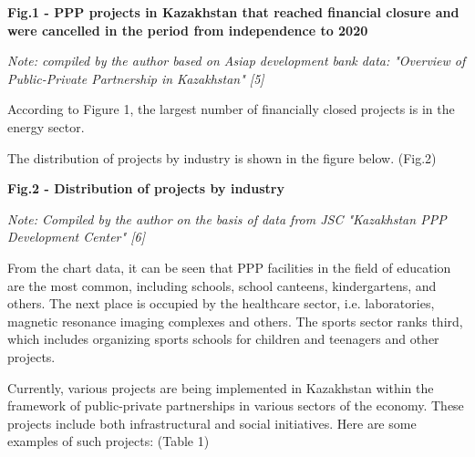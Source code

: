 {\bfseries Fig.1 - PPP projects in Kazakhstan that reached financial closure and were cancelled in the period from independence to 2020}

\emph{Note: compiled by the author based on Asiap development bank data:
"Overview of Public-Private Partnership in Kazakhstan" {[}5{]}}

\begin{multicols}{2}
According to Figure 1, the largest number of financially closed projects
is in the energy sector.

The distribution of projects by industry is shown in the figure below.
(Fig.2)
\end{multicols}

{\bfseries Fig.2 - Distribution of projects by industry}

\emph{Note: Compiled by the author on the basis of data from JSC
"Kazakhstan PPP Development Center" {[}6{]}}

\begin{multicols}{2}
From the chart data, it can be seen that PPP facilities in the field of
education are the most common, including schools, school canteens,
kindergartens, and others. The next place is occupied by the healthcare
sector, i.e. laboratories, magnetic resonance imaging complexes and
others. The sports sector ranks third, which includes organizing sports
schools for children and teenagers and other projects.

Currently, various projects are being implemented in Kazakhstan within
the framework of public-private partnerships in various sectors of the
economy. These projects include both infrastructural and social
initiatives. Here are some examples of such projects: (Table 1)
\end{multicols}


